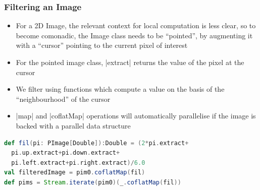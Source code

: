 \documentclass[mathserif,handout]{beamer}
\begin{document}
\begin{frame}[fragile]
\frametitle{Filtering an Image}
\begin{itemize}
\item For a 2D Image, the relevant context for local computation is less clear, so to become comonadic, the Image class needs to be ``pointed'', by augmenting it with a ``cursor'' pointing to the current pixel of interest
\item For the pointed image class, |extract| returns the value of the pixel at the cursor
\item We filter using functions which compute a value on the basis of the ``neighbourhood'' of the cursor
\item |map| and |coflatMap| operations will automatically parallelise if the image is backed with a parallel data structure
\end{itemize}
\begin{lstlisting}[language=scala]
def fil(pi: PImage[Double]):Double = (2*pi.extract+
  pi.up.extract+pi.down.extract+
  pi.left.extract+pi.right.extract)/6.0
val filteredImage = pim0.coflatMap(fil)  
def pims = Stream.iterate(pim0)(_.coflatMap(fil))
\end{lstlisting}
\end{frame}
\end{document}
